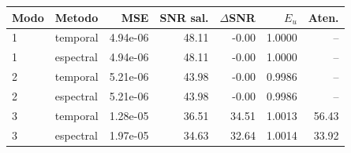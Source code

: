 \begin{tabular}{llrrrrr}
\toprule
Modo & Metodo & MSE & SNR sal. & $\Delta$SNR & $E_u$ & Aten. \\
\midrule
1 & temporal & 4.94e-06 & 48.11 & -0.00 & 1.0000 & -- \\
1 & espectral & 4.94e-06 & 48.11 & -0.00 & 1.0000 & -- \\
2 & temporal & 5.21e-06 & 43.98 & -0.00 & 0.9986 & -- \\
2 & espectral & 5.21e-06 & 43.98 & -0.00 & 0.9986 & -- \\
3 & temporal & 1.28e-05 & 36.51 & 34.51 & 1.0013 & 56.43 \\
3 & espectral & 1.97e-05 & 34.63 & 32.64 & 1.0014 & 33.92 \\
\bottomrule
\end{tabular}
